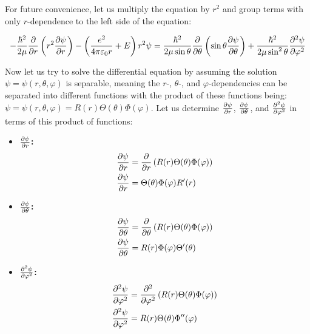 \documentclass{article}
\begin{document}
    For future convenience, let us multiply the equation by $r^2$ and group terms with only $r$-dependence to the left side of the equation:

    \begin{equation}
        \label{eq:separable}
        -\frac{\hbar^2}{2\mu}\pdv{}{r}\left( r^2\pdv{\psi}{r} \right) - \left( \frac{e^{2}}{4\pi\varepsilon_{0}r} + E \right)r^2\psi = \frac{\hbar^2}{2\mu\sin\theta}\pdv{}{\theta}\left( \sin\theta\pdv{\psi}{\theta} \right)
        + \frac{\hbar^2}{2\mu\sin^2\theta}\pdv[order = 2]{\psi}{\varphi}
    \end{equation}

    Now let us try to solve the differential equation by assuming the solution $\psi = \psi(r, \theta, \varphi)$ is separable, meaning the $r$-, $\theta$-, and $\varphi$-dependencies can be separated into different
    functions with the product of these functions being: $\psi = \psi(r, \theta, \varphi) = R(r)\Theta(\theta)\Phi(\varphi)$. Let us determine $\pdv{\psi}{r}$, $\pdv{\psi}{\theta}$, and $\pdv[order = 2]{\psi}{\varphi}$ in
    terms of this product of functions:

    \begin{itemize}
        \item \textbf{$\pdv{\psi}{r}$:}
            \begin{align}
                \pdv{\psi}{r} &= \pdv{}{r}\left( R(r)\Theta(\theta)\Phi(\varphi) \right) \\
                \pdv{\psi}{r} &= \Theta(\theta)\Phi(\varphi)R'(r)
            \end{align}
        \item \textbf{$\pdv{\psi}{\theta}$:}
            \begin{align}
                \pdv{\psi}{\theta} &= \pdv{}{\theta}\left( R(r)\Theta(\theta)\Phi(\varphi) \right) \\
                \pdv{\psi}{\theta} &= R(r)\Phi(\varphi)\Theta'(\theta)
            \end{align}
        \item \textbf{$\pdv[order=2]{\psi}{\varphi}$:}
            \begin{align}
                \pdv[order=2]{\psi}{\varphi} &= \pdv[order=2]{}{\varphi}\left( R(r)\Theta(\theta)\Phi(\varphi) \right) \\
                \pdv[order=2]{\psi}{\varphi} &= R(r)\Theta(\theta)\Phi''(\varphi)
            \end{align}
    \end{itemize}
      
\end{document}
